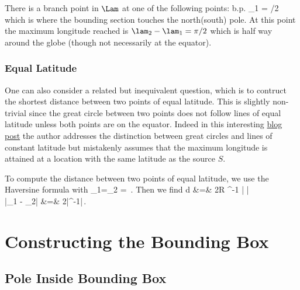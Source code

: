 \documentclass[preprint,12pt]{article}
\begin{document}
There is a branch point  in $\Lam$ at one of the following points:
\be
{\rm b.p.} \quad \vphi_1 \pm {} = \pm \pi/2
\ee
which is where the bounding section touches the north(south) pole. At this point the maximum longitude reached is $\lam_2-\lam_1 = \pi/2$ which is half way around the globe (though not necessarily at the equator).


\subsubsection{Equal  Latitude}

One can also consider a related but inequivalent question, which is to contruct the shortest distance between two points of equal latitude. This is slightly non-trivial since the great circle between two points does not follow lines of equal latitude unless both points are on the equator. Indeed in this interesting \href{http://janmatuschek.de/LatitudeLongitudeBoundingCoordinates}{blog post} the author addresses the distinction between great circles and lines of constant latitude but mistakenly assumes that the maximum longitude is attained at a location with the same latitude as the source $S$. 

To compute the distance between two points of equal latitude, we use the Haversine formula with
\be
\vphi_1=\vphi_2 = \vphi\,.
\ee
Then we find
\bea
d &=&  2R \sin^{-1} \Big| \cos \vphi   \sin \Blp {}\Brp \Big|  \\
\Ra \quad |\lam_1 - \lam_2| &=& 2\left|\sin^{-1}\right|\,.
\eea
 


\section{Constructing the Bounding Box}

\subsection{Pole Inside Bounding Box}
\end{document}
